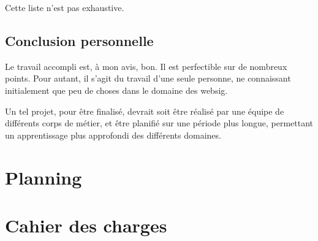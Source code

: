 \documentclass[
    iai, %
    il, %
]{heig-tb}
\begin{document}
Cette liste n'est pas exhaustive.

\section{Conclusion personnelle}
Le travail accompli est, à mon avis, bon. Il est perfectible sur de nombreux points.
Pour autant, il s'agit du travail d'une seule personne, ne connaissant initialement que peu de choses dans le domaine des \gls{websig}.

Un tel projet, pour être finalisé, devrait soit être réalisé par une équipe de différents corps de métier,
et être planifié sur une période plus longue, permettant un apprentissage plus approfondi des différents domaines.

\vfil
\hspace{8cm}\makeatletter\@author\makeatother\par
\hspace{8cm}\begin{minipage}{5cm}
    \printsignature
\end{minipage}
\clearpage

\appendix
\appendixpage
\addappheadtotoc

\chapter{Planning}



\chapter{Cahier des charges}



\let\cleardoublepage\clearpage
\backmatter

\label{glossaire}
\printnoidxglossary
\printbibliography
\label{index}
\printindex
\end{document}
